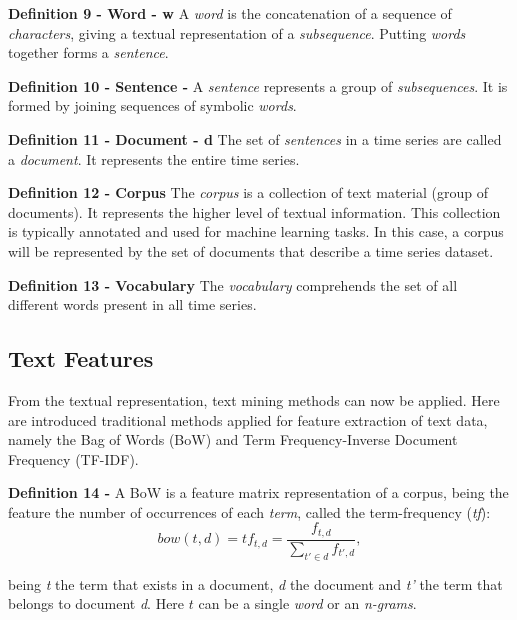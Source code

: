 \item \textbf{Definition 9 - Word - w} A \textit{word} is the concatenation of a sequence of \textit{characters}, giving a textual representation of a \textit{subsequence}. Putting \textit{words} together forms a \textit{sentence}.

\item \textbf{Definition 10 - Sentence - } A \textit{sentence} represents a group of \textit{subsequences}. It is formed by joining sequences of symbolic \textit{words}.

\item \textbf{Definition 11 - Document - d} The set of \textit{sentences} in a time series are called a \textit{document}. It represents the entire time series.

\item \textbf{Definition 12 - Corpus} The \textit{corpus} is a collection of text material (group of documents). It represents the higher level of textual information. This collection is typically annotated and used for machine learning tasks. In this case, a corpus will be represented by the set of documents that describe a time series dataset.

\item \textbf{Definition 13 - Vocabulary} The \textit{vocabulary} comprehends the set of all different words present in all time series.

\subsection{Text Features}
\label{subsec:text_features}

From the textual representation, text mining methods can now be applied. Here are introduced traditional methods applied for feature extraction of text data, namely the Bag of Words (BoW) and  Term Frequency-Inverse Document Frequency (TF-IDF).
\par

\item \textbf{Definition 14 - } A BoW is a feature matrix representation of a corpus, being the feature the number of occurrences of each \textit{term}, called the term-frequency (\textit{tf}):
\begin{equation}
    bow(t,d) = tf_{t, d} = \frac{f_{t,d}}{\sum\limits_{t'\in d} f_{t',d}}, 
\end{equation}

being \textit{t} the term that exists in a document, \textit{d} the document and \textit{t'} the term that belongs to document \textit{d}. Here $t$ can be a single \textit{word} or an \textit{n-grams}.

